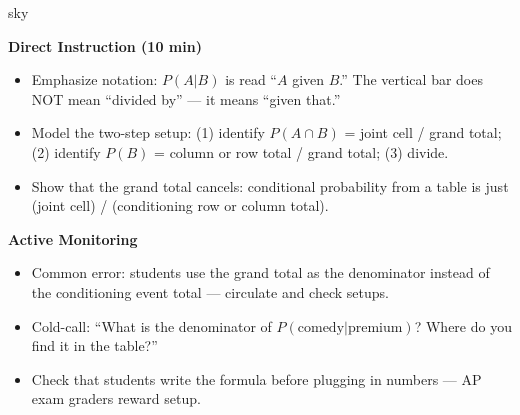 \documentclass[10pt]{article}
\begin{document}
\begin{skillbox}{sky}
\begin{minipage}[t]{0.48\linewidth}
    \textbf{Direct Instruction (10 min)}
    \begin{itemize}
        \item Emphasize notation: $P(A|B)$ is read ``$A$ given $B$.'' The vertical bar
              does NOT mean ``divided by'' --- it means ``given that.''
        \item Model the two-step setup:
              (1) identify $P(A \cap B)$ = joint cell / grand total;
              (2) identify $P(B)$ = column or row total / grand total;
              (3) divide.
        \item Show that the grand total cancels: conditional probability from a table
              is just (joint cell) / (conditioning row or column total).
    \end{itemize}
\end{minipage}
\hfill
\begin{minipage}[t]{0.48\linewidth}
    \textbf{Active Monitoring}
    \begin{itemize}
        \item Common error: students use the grand total as the denominator instead of
              the conditioning event total --- circulate and check setups.
        \item Cold-call: ``What is the denominator of $P(\text{comedy} | \text{premium})$?
              Where do you find it in the table?''
        \item Check that students write the formula before plugging in numbers ---
              AP exam graders reward setup.
    \end{itemize}
\end{minipage}
\end{skillbox}
\end{document}
